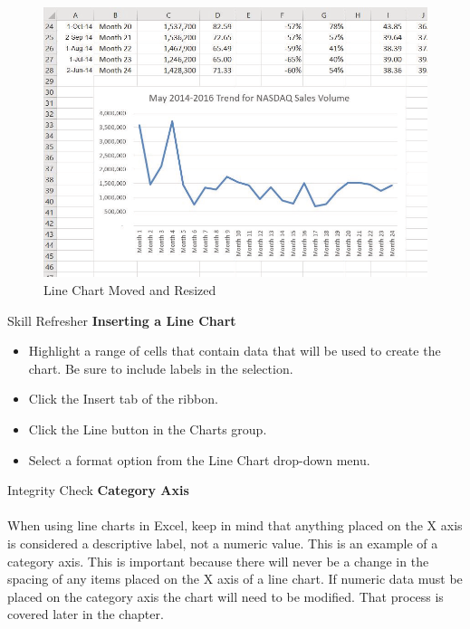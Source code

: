 \begin{figure}[H]
	\centering
	\includegraphics[width=\maxwidth{.95\linewidth}]{gfx/ch04_fig04}
	\caption{Line Chart Moved and Resized}
	\label{04:fig04}
\end{figure}

\begin{center}
	\begin{sklbox}{Skill Refresher}
		\textbf{Inserting a Line Chart}
		\\
		\begin{itemize}
			\setlength{\itemsep}{0pt}
			\setlength{\parskip}{0pt}
			\setlength{\parsep}{0pt}

			\item Highlight a range of cells that contain data that will be used to create the chart. Be sure to include labels in the selection.
			\item Click the Insert tab of the ribbon.
			\item Click the Line button in the Charts group.
			\item Select a format option from the Line Chart drop-down menu.
			
		\end{itemize}
	\end{sklbox}
\end{center}

\begin{center}
	\begin{infobox}{Integrity Check}
		\textbf{Category Axis}
		\\
		\\
		When using line charts in Excel, keep in mind that anything placed on the X axis is considered a descriptive label, not a numeric value. This is an example of a category axis. This is important because there will never be a change in the spacing of any items placed on the X axis of a line chart. If numeric data must be placed on the category axis the chart will need to be modified. That process is covered later in the chapter.		
	\end{infobox}
\end{center}




